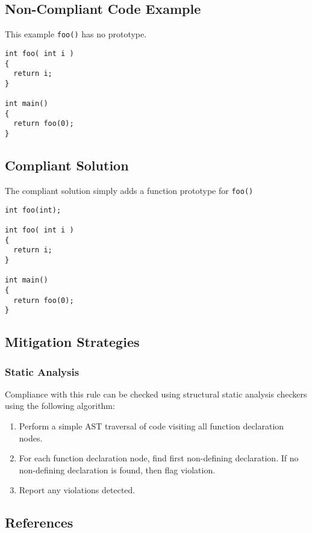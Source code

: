 \subsection{Non-Compliant Code Example}
This example {\tt foo()} has no prototype.

\begin{verbatim}
int foo( int i )
{
  return i;
}

int main()
{
  return foo(0);
}
\end{verbatim}

\subsection{Compliant Solution}
The compliant solution simply adds a function prototype for {\tt foo()}

\begin{verbatim}
int foo(int);

int foo( int i )
{
  return i;
}

int main()
{
  return foo(0);
}
\end{verbatim}

\subsection{Mitigation Strategies}
\subsubsection{Static Analysis} 

Compliance with this rule can be checked using structural static analysis checkers using the following algorithm:

\begin{enumerate}
\item Perform a simple AST traversal of code visiting all function declaration nodes.
\item For each function declaration node, find first non-defining declaration. If no non-defining declaration is found, then flag violation.
\item Report any violations detected.
\end{enumerate}

\subsection{References}

